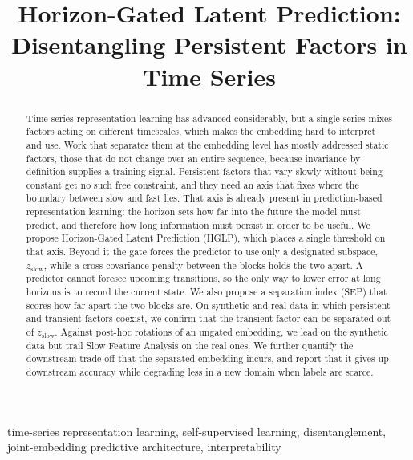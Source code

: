 \documentclass[conference]{IEEEtran}
\newcommand{\zslow}{z_{\mathrm{slow}}}
\begin{document}
\title{Horizon-Gated Latent Prediction: Disentangling Persistent Factors in Time Series}

\author{
}

\maketitle

\begin{abstract}
Time-series representation learning has advanced considerably, but a single series mixes factors acting on different timescales, which makes the embedding hard to interpret and use. Work that separates them at the embedding level has mostly addressed static factors, those that do not change over an entire sequence, because invariance by definition supplies a training signal. Persistent factors that vary slowly without being constant get no such free constraint, and they need an axis that fixes where the boundary between slow and fast lies. That axis is already present in prediction-based representation learning: the horizon sets how far into the future the model must predict, and therefore how long information must persist in order to be useful. We propose Horizon-Gated Latent Prediction (HGLP), which places a single threshold on that axis. Beyond it the gate forces the predictor to use only a designated subspace, $\zslow$, while a cross-covariance penalty between the blocks holds the two apart. A predictor cannot foresee upcoming transitions, so the only way to lower error at long horizons is to record the current state. We also propose a separation index (SEP) that scores how far apart the two blocks are. On synthetic and real data in which persistent and transient factors coexist, we confirm that the transient factor can be separated out of $\zslow$. Against post-hoc rotations of an ungated embedding, we lead on the synthetic data but trail Slow Feature Analysis on the real ones. We further quantify the downstream trade-off that the separated embedding incurs, and report that it gives up downstream accuracy while degrading less in a new domain when labels are scarce.
\end{abstract}

\begin{IEEEkeywords}
time-series representation learning, self-supervised learning, disentanglement, joint-embedding predictive architecture, interpretability
\end{IEEEkeywords}
\end{document}
